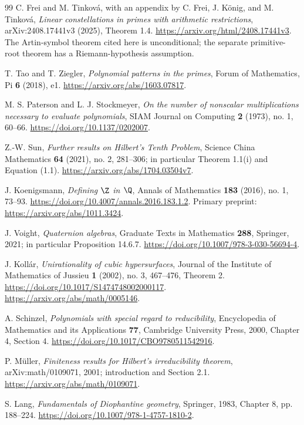 \begin{thebibliography}{99}
C. Frei and M. Tinkov\'a, with an appendix by C. Frei, J. K\"onig,
and M. Tinkov\'a, \emph{Linear constellations in primes with arithmetic
restrictions}, arXiv:2408.17441v3 (2025), Theorem 1.4.
\url{https://arxiv.org/html/2408.17441v3}.
The Artin-symbol theorem cited here is unconditional; the separate
primitive-root theorem has a Riemann-hypothesis assumption.

T. Tao and T. Ziegler, \emph{Polynomial patterns in the primes},
Forum of Mathematics, Pi \textbf{6} (2018), e1.
\url{https://arxiv.org/abs/1603.07817}.

M. S. Paterson and L. J. Stockmeyer, \emph{On the number of nonscalar
multiplications necessary to evaluate polynomials}, SIAM Journal on
Computing \textbf{2} (1973), no. 1, 60--66.
\url{https://doi.org/10.1137/0202007}.

Z.-W. Sun, \emph{Further results on Hilbert's Tenth Problem},
Science China Mathematics \textbf{64} (2021), no. 2, 281--306;
in particular Theorem 1.1(i) and Equation (1.1).
\url{https://arxiv.org/abs/1704.03504v7}.

J. Koenigsmann, \emph{Defining $\Z$ in $\Q$}, Annals of Mathematics
\textbf{183} (2016), no. 1, 73--93.
\url{https://doi.org/10.4007/annals.2016.183.1.2}.
Primary preprint: \url{https://arxiv.org/abs/1011.3424}.

J. Voight, \emph{Quaternion algebras}, Graduate Texts in Mathematics
\textbf{288}, Springer, 2021; in particular Proposition 14.6.7.
\url{https://doi.org/10.1007/978-3-030-56694-4}.

J. Koll\'ar, \emph{Unirationality of cubic hypersurfaces}, Journal
of the Institute of Mathematics of Jussieu \textbf{1} (2002), no. 3,
467--476, Theorem 2.
\url{https://doi.org/10.1017/S1474748002000117}.
\url{https://arxiv.org/abs/math/0005146}.

A. Schinzel, \emph{Polynomials with special regard to reducibility},
Encyclopedia of Mathematics and its Applications \textbf{77},
Cambridge University Press, 2000, Chapter 4, Section 4.
\url{https://doi.org/10.1017/CBO9780511542916}.

P. M\"uller, \emph{Finiteness results for Hilbert's irreducibility
theorem}, arXiv:math/0109071, 2001; introduction and Section 2.1.
\url{https://arxiv.org/abs/math/0109071}.

S. Lang, \emph{Fundamentals of Diophantine geometry}, Springer, 1983,
Chapter 8, pp. 188--224.
\url{https://doi.org/10.1007/978-1-4757-1810-2}.


\end{thebibliography}
